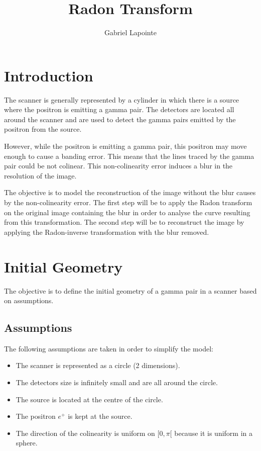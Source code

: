 \documentclass{article}
\title{Radon Transform}
\author{Gabriel Lapointe}
\begin{document}
\maketitle

\tableofcontents

\section{Introduction}
The scanner is generally represented by a cylinder in which there is a source where the positron is emitting a gamma pair. The detectors are located all around the scanner and are used to detect the gamma pairs emitted by the positron from the source.

However, while the positron is emitting a gamma pair, this positron may move enough to cause a banding error. This means that the lines traced by the gamma pair could be not colinear. This non-colinearity error induces a blur in the resolution of the image.

The objective is to model the reconstruction of the image without the blur causes by the non-colinearity error.  The first step will be to apply the Radon transform on the original image containing the blur in order to analyse the curve resulting from this transformation. The second step will be to reconstruct the image by applying the Radon-inverse transformation with the blur removed.


\section{Initial Geometry}
The objective is to define the initial geometry of a gamma pair in a scanner based on assumptions. 

\subsection{Assumptions}
The following assumptions are taken in order to simplify the model:
\begin{itemize}
	\item The scanner is represented as a circle (2 dimensions).
	\item The detectors size is infinitely small and are all around the circle.
	\item The source is located at the centre of the circle.
	\item The positron $e^+$ is kept at the source.
	\item The direction of the colinearity is uniform on $[0, \pi[$ because it is uniform in a sphere.
\end{itemize}
\end{document}
